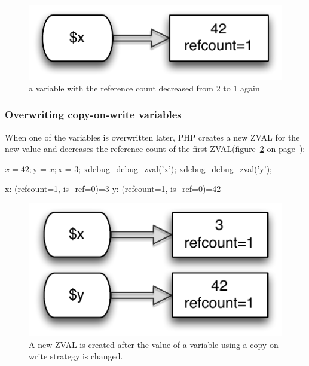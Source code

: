 \begin{figure}[!h]
  \begin{center}
    \includegraphics[scale=0.8]{images/x_42}
    \caption{a variable with the reference count decreased from 2 to 1 again}
    \label{fig:reference-count-decreased}
  \end{center}
\end{figure}


\subsubsection{Overwriting copy-on-write variables}
\label{sec:overwriting}

When one of the variables is overwritten later, PHP creates a new ZVAL for the new value and decreases the reference count of the first ZVAL(figure~\ref{fig:new-zval-after-copy-on-write} on page~\pageref{fig:new-zval-after-copy-on-write}):

\begin{phpcode}
$x = 42;
$y = $x;
$x = 3;
xdebug_debug_zval('x');
xdebug_debug_zval('y');
\end{phpcode}

\begin{textcode}
x: (refcount=1, is_ref=0)=3
y: (refcount=1, is_ref=0)=42
\end{textcode}

\begin{figure}[!h]
  \begin{center}
    \includegraphics[scale=0.8]{images/x_3_y_42}
    \caption{A new ZVAL is created after the value of a variable using a copy-on-write strategy is changed.}
    \label{fig:new-zval-after-copy-on-write}
  \end{center}
\end{figure}


